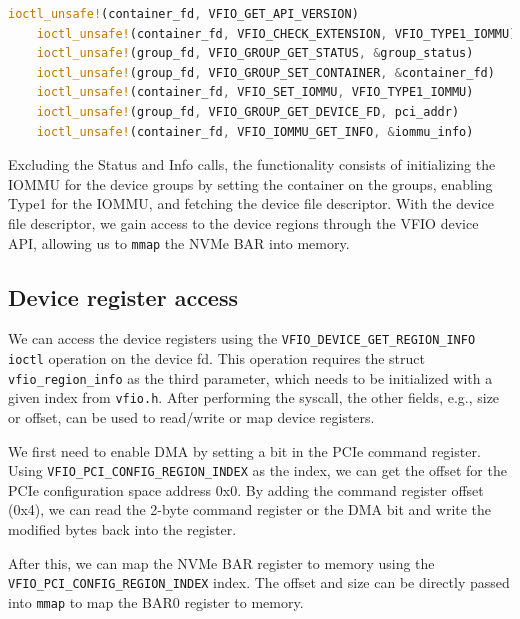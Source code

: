 \begin{lstlisting}[language=Rust, caption={\texttt{ioctl} calls needed for IOMMU initialization}, label=lst:containerioctls]
    ioctl_unsafe!(container_fd, VFIO_GET_API_VERSION)
    ioctl_unsafe!(container_fd, VFIO_CHECK_EXTENSION, VFIO_TYPE1_IOMMU)
    ioctl_unsafe!(group_fd, VFIO_GROUP_GET_STATUS, &group_status)
    ioctl_unsafe!(group_fd, VFIO_GROUP_SET_CONTAINER, &container_fd)
    ioctl_unsafe!(container_fd, VFIO_SET_IOMMU, VFIO_TYPE1_IOMMU)
    ioctl_unsafe!(group_fd, VFIO_GROUP_GET_DEVICE_FD, pci_addr)
    ioctl_unsafe!(container_fd, VFIO_IOMMU_GET_INFO, &iommu_info)   
\end{lstlisting}

Excluding the Status and Info calls, the functionality consists of initializing the IOMMU for the device groups by setting the container on the groups, enabling Type1 for the IOMMU, and fetching the device file descriptor. With the device file descriptor, we gain access to the device regions through the VFIO device API, allowing us to \texttt{mmap} the NVMe BAR into memory.

\subsection{Device register access}\label{sec:pcieconfig}
We can access the device registers using the \texttt{VFIO\_DEVICE\_GET\_REGION\_INFO} \texttt{ioctl} operation on the device fd. This operation requires the struct \texttt{vfio\_region\_info} as the third parameter, which needs to be initialized with a given index from \texttt{vfio.h}. After performing the syscall, the other fields, e.g., size or offset, can be used to read/write or map device registers.

We first need to enable DMA by setting a bit in the PCIe command register.
Using \texttt{VFIO\_PCI\_CONFIG\_REGION\_INDEX} as the index, we can get the offset for the PCIe configuration space address 0x0. By adding the command register offset (0x4), we can read the 2-byte command register or the DMA bit and write the modified bytes back into the register.

After this, we can map the NVMe BAR register to memory using the \texttt{VFIO\_PCI\_CONFIG\_REGION\_INDEX} index.
The offset and size can be directly passed into \texttt{mmap} to map the BAR0 register to memory.

